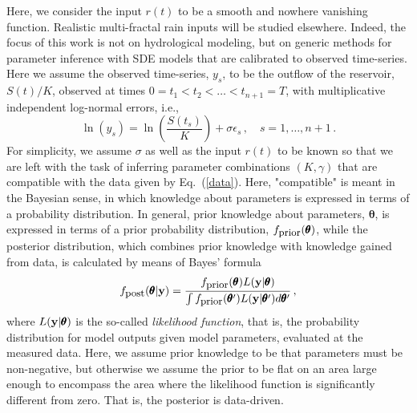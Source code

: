 \documentclass[12pt,a4paper,final]{iopart}
\newcommand{\bt}{\pmb\theta}
\newcommand{\vc}[1]{{\bf #1 }}
\begin{document}
Here, we consider the input $r(t)$ to be a smooth and nowhere vanishing function. Realistic multi-fractal rain inputs \cite{tessier_1996} will be studied elsewhere.
Indeed, the focus of this work is not on hydrological modeling, but on generic methods for parameter inference with SDE models that are calibrated to observed time-series.
Here we assume the observed time-series, $y_s$, to be the outflow of the reservoir, $S(t)/K$, observed at times $0=t_1<t_2<\dots < t_{n+1}=T$, with multiplicative independent log-normal errors, i.e.,
\begin{equation}\label{data}
  \ln \left( y_s \right)
  =
  \ln \left( \frac{S(t_s)}{K} \right)
  +
  \sigma\epsilon_s\,,\quad s=1,\dots,n+1\,.
\end{equation}
For simplicity, we assume $\sigma$ as well as the input $r(t)$ to be known so that we are left with the task of inferring parameter combinations $(K,\gamma)$ that are compatible with the data given by Eq.~(\ref{data}).
Here, "compatible" is meant in the Bayesian sense, in which knowledge about parameters is expressed in terms of a probability distribution.
In general, prior knowledge about parameters, $\bt$, is expressed in terms of a prior probability distribution, $f_{\mbox{\small prior}}(\bt)$, while the posterior distribution, which combines prior knowledge with knowledge gained from data, is calculated by means of Bayes' formula
\begin{equation}\label{Bayes}
  f_{\mbox{\small post}}(\bt|\vc y)
  =
  \frac{f_{\mbox{\small prior}}(\bt)L(\vc y|\bt)}
  {\int f_{\mbox{\small prior}}(\bt')L(\vc y|\bt')d\bt'}\,,
\end{equation}
where $L(\vc y|\bt)$ is the so-called {\em likelihood function}, that is, the probability distribution for model outputs given model parameters, evaluated at the measured data.
Here, we assume prior knowledge to be that parameters must be non-negative, but otherwise we assume the prior to be flat on an area large enough to encompass the area where the likelihood function is significantly different from zero. That is, the posterior is data-driven.
\end{document}
